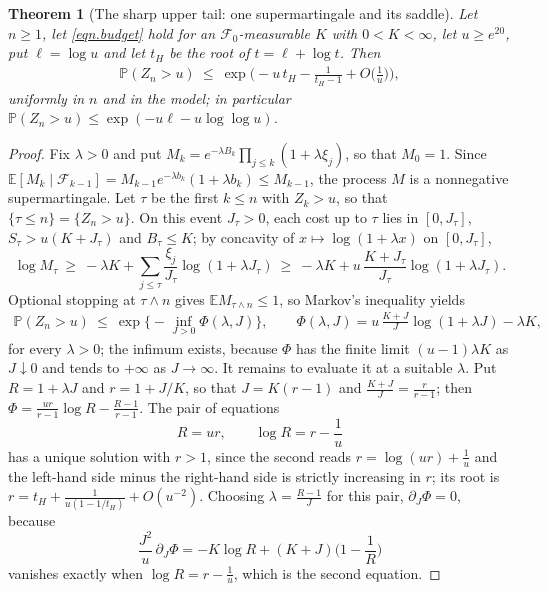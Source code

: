 \documentclass[12pt,oneside,reqno,fleqn]{amsart}
\numberwithin{equation}{section}
\newtheorem{theorem}{Theorem}[section]
\theoremstyle{remark}
\newcommand\cff{{\mathcal F}}
\newcommand\mE{{\mathbb E}}
\newcommand\E{\mE}
\newcommand\PP{{\mathbb P}}
\newcommand{\1}{{\mathbf 1}}
\renewcommand{\le}{\leq}
\renewcommand{\ge}{\geq}
\begin{document}
		\begin{theorem}[The sharp upper tail: one supermartingale and its saddle]\label{thm.refined}
		Let $n\ge1$, let \eqref{eqn.budget} hold for an $\cff_0$-measurable $K$ with $0<K<\infty$, let $u\ge e^{20}$, put $\ell=\log u$ and let $t_H$ be the root of $t=\ell+\log t$. Then
		\begin{align}\label{eqn.refined}
			\PP(Z_n>u)\ \le\ \exp\Big(-u\,t_H-\frac1{t_H-1}+O\Big(\frac1u\Big)\Big),
		\end{align}
		uniformly in $n$ and in the model; in particular $\PP(Z_n>u)\le\exp(-u\ell-u\log\log u)$.
	\end{theorem}
	\begin{proof}
		Fix $\lambda>0$ and put $M_k=e^{-\lambda B_k}\prod_{j\le k}(1+\lambda\xi_j)$, so that $M_0=1$. Since $\E[M_k\mid\cff_{k-1}]=M_{k-1}e^{-\lambda b_k}(1+\lambda b_k)\le M_{k-1}$, the process $M$ is a nonnegative supermartingale. Let $\tau$ be the first $k\le n$ with $Z_k>u$, so that $\{\tau\le n\}=\{Z_n>u\}$. On this event $J_\tau>0$, each cost up to $\tau$ lies in $[0,J_\tau]$, $S_\tau>u(K+J_\tau)$ and $B_\tau\le K$; by concavity of $x\mapsto\log(1+\lambda x)$ on $[0,J_\tau]$,
		\[
			\log M_\tau\ \ge\ -\lambda K+\sum_{j\le\tau}\frac{\xi_j}{J_\tau}\log(1+\lambda J_\tau)\ \ge\ -\lambda K+u\,\frac{K+J_\tau}{J_\tau}\log(1+\lambda J_\tau).
		\]
		Optional stopping at $\tau\wedge n$ gives $\E M_{\tau\wedge n}\le1$, so Markov's inequality yields
		\begin{align}\label{eqn.prod}
			\PP(Z_n>u)\ \le\ \exp\Big\{-\inf_{J>0}\Phi(\lambda,J)\Big\},\qquad
			\Phi(\lambda,J)=u\,\frac{K+J}{J}\log(1+\lambda J)-\lambda K,
		\end{align}
		for every $\lambda>0$; the infimum exists, because $\Phi$ has the finite limit $(u-1)\lambda K$ as $J\downarrow0$ and tends to $+\infty$ as $J\to\infty$.
		It remains to evaluate it at a suitable $\lambda$. Put $R=1+\lambda J$ and $r=1+J/K$, so that $J=K(r-1)$ and $\frac{K+J}{J}=\frac r{r-1}$; then $\Phi=\frac{ur}{r-1}\log R-\frac{R-1}{r-1}$. The pair of equations
		\[
			R=ur,\qquad \log R=r-\frac1u
		\]
		has a unique solution with $r>1$, since the second reads $r=\log(ur)+\frac1u$ and the left-hand side minus the right-hand side is strictly increasing in $r$; its root is $r=t_H+\frac1{u(1-1/t_H)}+O(u^{-2})$. Choosing $\lambda=\frac{R-1}{J}$ for this pair, $\partial_J\Phi=0$, because
		\[
			\frac{J^2}{u}\,\partial_J\Phi=-K\log R+(K+J)\Big(1-\frac1R\Big)
		\]
		vanishes exactly when $\log R=r-\frac1u$, which is the second equation.


\end{proof}
\end{document}
